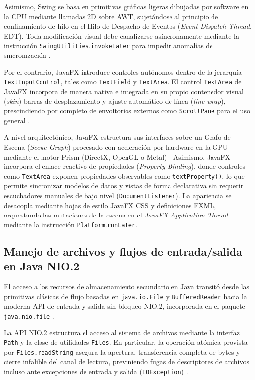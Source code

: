 \documentclass[letterpaper,12pt,oneside]{article}
\numberwithin{figure}{section}
\begin{document}
Asimismo, Swing se basa en primitivas gráficas ligeras dibujadas por software en la CPU mediante llamadas 2D sobre AWT, sujetándose al principio de confinamiento de hilo en el Hilo de Despacho de Eventos (\textit{Event Dispatch Thread}, EDT). Toda modificación visual debe canalizarse asíncronamente mediante la instrucción \texttt{SwingUtilities}.\allowbreak\texttt{invokeLater} para impedir anomalías de sincronización \cite{oracleswing}.

Por el contrario, JavaFX introduce controles autónomos dentro de la jerarquía \texttt{TextInputControl}, tales como \texttt{TextField} y \texttt{TextArea}. El control \texttt{TextArea} de JavaFX incorpora de manera nativa e integrada en su propio contenedor visual (\textit{skin}) barras de desplazamiento y ajuste automático de línea (\textit{line wrap}), prescindiendo por completo de envoltorios externos como \texttt{ScrollPane} para el uso general \cite{openjavafx}.

A nivel arquitectónico, JavaFX estructura sus interfaces sobre un Grafo de Escena (\textit{Scene Graph}) procesado con aceleración por hardware en la GPU mediante el motor Prism (DirectX, OpenGL o Metal) \cite{openjavafx}. Asimismo, JavaFX incorpora el enlace reactivo de propiedades (\textit{Property Binding}), donde controles como \texttt{TextArea} exponen propiedades observables como \texttt{textProperty()}, lo que permite sincronizar modelos de datos y vistas de forma declarativa sin requerir escuchadores manuales de bajo nivel (\texttt{DocumentListener}). La apariencia se desacopla mediante hojas de estilo JavaFX CSS y definiciones FXML, orquestando las mutaciones de la escena en el \textit{JavaFX Application Thread} mediante la instrucción \texttt{Platform}.\allowbreak\texttt{runLater}.

\subsection{Manejo de archivos y flujos de entrada/salida en Java NIO.2}
El acceso a los recursos de almacenamiento secundario en Java transitó desde las primitivas clásicas de flujo basadas en \texttt{java.io.File} y \texttt{BufferedReader} hacia la moderna API de entrada y salida sin bloqueo NIO.2, incorporada en el paquete \texttt{java.nio.file} \cite{oraclejavaio}.

La API NIO.2 estructura el acceso al sistema de archivos mediante la interfaz \texttt{Path} y la clase de utilidades \texttt{Files}. En particular, la operación atómica provista por \texttt{Files.\-readString} asegura la apertura, transferencia completa de bytes y cierre infalible del canal de lectura, previniendo fugas de descriptores de archivos incluso ante excepciones de entrada y salida (\texttt{IOException}) \cite{oraclejavaio}.
\end{document}
